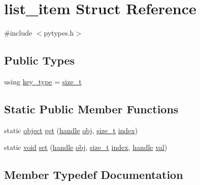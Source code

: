 \hypertarget{structlist__item}{}\section{list\+\_\+item Struct Reference}
\label{structlist__item}


{\ttfamily \#include $<$pytypes.\+h$>$}

\subsection*{Public Types}
\begin{DoxyCompactItemize}
\item 
using \mbox{\hyperlink{structlist__item_a8161f969e54abc8caaa5115ae8fdd535}{key\+\_\+type}} = \mbox{\hyperlink{detail_2common_8h_a801d6a451a01953ef8cbae6feb6a3638}{size\+\_\+t}}
\end{DoxyCompactItemize}
\subsection*{Static Public Member Functions}
\begin{DoxyCompactItemize}
\item 
static \mbox{\hyperlink{classobject}{object}} \mbox{\hyperlink{structlist__item_a49b34355f8d246e5e26c14b840b74cfa}{get}} (\mbox{\hyperlink{classhandle}{handle}} \mbox{\hyperlink{_s_d_l__opengl__glext_8h_a0c0d4701a6c89f4f7f0640715d27ab26}{obj}}, \mbox{\hyperlink{detail_2common_8h_a801d6a451a01953ef8cbae6feb6a3638}{size\+\_\+t}} \mbox{\hyperlink{_s_d_l__opengl__glext_8h_a57f14e05b1900f16a2da82ade47d0c6d}{index}})
\item 
static \mbox{\hyperlink{_s_d_l__opengles2__gl2ext_8h_ae5d8fa23ad07c48bb609509eae494c95}{void}} \mbox{\hyperlink{structlist__item_a26f4e8eff2de092ab9d64b847790b7dd}{set}} (\mbox{\hyperlink{classhandle}{handle}} \mbox{\hyperlink{_s_d_l__opengl__glext_8h_a0c0d4701a6c89f4f7f0640715d27ab26}{obj}}, \mbox{\hyperlink{detail_2common_8h_a801d6a451a01953ef8cbae6feb6a3638}{size\+\_\+t}} \mbox{\hyperlink{_s_d_l__opengl__glext_8h_a57f14e05b1900f16a2da82ade47d0c6d}{index}}, \mbox{\hyperlink{classhandle}{handle}} \mbox{\hyperlink{_s_d_l__opengl__glext_8h_a26942fd2ed566ef553eae82d2c109c8f}{val}})
\end{DoxyCompactItemize}


\subsection{Member Typedef Documentation}
\mbox{\label{structlist__item_a8161f969e54abc8caaa5115ae8fdd535}} 
